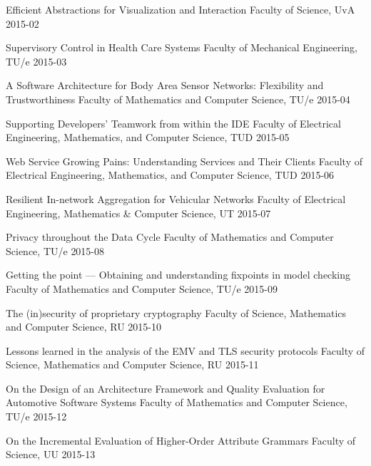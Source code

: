 \begin{multicols}{2}
         {Efficient Abstractions for Visualization and Interaction}
         {Faculty of Science, UvA}
         {2015-02}

         {Supervisory Control in Health Care Systems}
         {Faculty of Mechanical Engineering, TU/e}
         {2015-03}

         {A Software Architecture for Body Area Sensor Networks: Flexibility and Trustworthiness}
         {Faculty of Mathematics and Computer Science, TU/e}
         {2015-04}

         {Supporting Developers' Teamwork from within the IDE}
         {Faculty of Electrical Engineering, Mathematics, and Computer Science, TUD}
         {2015-05}

         {Web Service Growing Pains: Understanding Services and Their Clients}
         {Faculty of Electrical Engineering, Mathematics, and Computer Science, TUD}
         {2015-06}

         {Resilient In-network Aggregation for Vehicular Networks}
         {Faculty of Electrical Engineering, Mathematics \& Computer Science, UT}
         {2015-07}

         {Privacy throughout the Data Cycle}
         {Faculty of Mathematics and Computer Science, TU/e}
         {2015-08}

         {Getting the point --- Obtaining and understanding fixpoints in model checking}
         {Faculty of Mathematics and Computer Science, TU/e}
         {2015-09}


         {The (in)security of proprietary cryptography}
         {Faculty of Science, Mathematics and Computer Science, RU}
         {2015-10}

         {Lessons learned in the analysis of the EMV and TLS security protocols}
         {Faculty of Science, Mathematics and Computer Science, RU}
         {2015-11}

         {On the Design of an Architecture Framework and Quality Evaluation for Automotive Software Systems}
         {Faculty of Mathematics and Computer Science, TU/e}
         {2015-12}

         {On the Incremental Evaluation of Higher-Order Attribute Grammars}
         {Faculty of Science, UU}
         {2015-13}


\end{multicols}
